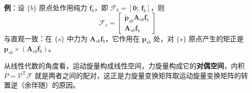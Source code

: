 \textbf{例}：设 $\{b\}$ 原点处作用纯力 $\boldsymbol{f}_{b}$，即 $\mathcal{F}_{b}=[\boldsymbol{0};\ \boldsymbol{f}_{b}]$，则
\begin{equation}
	\label{eq:力旋量:纯力例}
	\mathcal{F}_{s}=\begin{bmatrix}
		\tilde{\boldsymbol{p}}_{sb}\boldsymbol{A}_{sb}\boldsymbol{f}_{b}\\
		\boldsymbol{A}_{sb}\boldsymbol{f}_{b}
	\end{bmatrix}
\end{equation}
与直观一致：在 $\{s\}$ 中力为 $\boldsymbol{A}_{sb}\boldsymbol{f}_{b}$，它作用在 $\boldsymbol{p}_{sb}$ 处，对 $\{s\}$ 原点产生的矩正是 $\boldsymbol{p}_{sb}\times(\boldsymbol{A}_{sb}\boldsymbol{f}_{b})$。

从线性代数的角度看，运动旋量构成线性空间，力旋量构成它的\textbf{对偶空间}，内积 $P=\mathcal{V}^{\mathrm{T}}\mathcal{F}$ 就是两者之间的配对，这正是力旋量变换矩阵取运动旋量变换矩阵的转置逆（余伴随）的原因。
